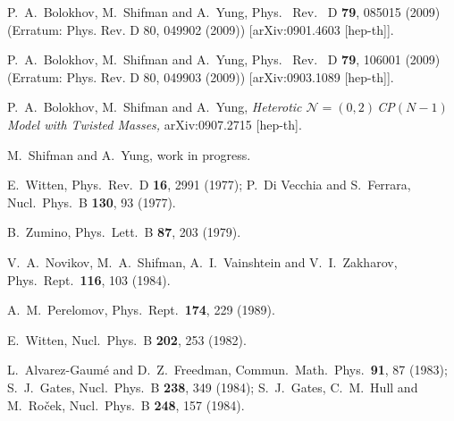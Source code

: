 \documentclass[epsfig,12pt]{article}
\newcommand{\nzt}{${\mathcal N}=(0,2)\,$}
\newcommand{\cpn}{CP$(N-1)\,$}
\begin{document}
{\begin{thebibliography}{99}
P.~A.~Bolokhov, M.~Shifman and A.~Yung,
  Phys. \ Rev. \ D {\bf 79}, 085015 (2009) (Erratum: Phys. Rev. D 80, 049902 (2009))
  [arXiv:0901.4603 [hep-th]].
  
  P.~A.~Bolokhov, M.~Shifman and A.~Yung,
  Phys. \ Rev. \ D {\bf 79}, 106001 (2009) (Erratum: Phys. Rev. D 80, 049903 (2009))
  [arXiv:0903.1089 [hep-th]].
  
  P.~A.~Bolokhov, M.~Shifman and A.~Yung,
{\em Heterotic \nzt \mbox{\cpn} Model with Twisted Masses,}
  arXiv:0907.2715 [hep-th].
  
   M.~Shifman and A.~Yung, work in progress.
  
  E.~Witten,
  Phys.\ Rev.\  D {\bf 16}, 2991 (1977);
  P.~Di Vecchia and S.~Ferrara,
  Nucl.\ Phys.\  B {\bf 130}, 93 (1977).

 B.~Zumino,
  Phys.\ Lett.\  B {\bf 87}, 203 (1979).

 V.~A.~Novikov, M.~A.~Shifman, A.~I.~Vainshtein and V.~I.~Zakharov,
  Phys.\ Rept.\  {\bf 116}, 103 (1984).
   
 A.~M.~Perelomov,
  Phys.\ Rept.\  {\bf 174}, 229 (1989).
  
  E.~Witten,
  Nucl.\ Phys.\  B {\bf 202}, 253 (1982).
  
 L.~Alvarez-Gaum\'{e} and D.~Z.~Freedman,
Commun.\ Math.\ Phys.\  {\bf 91}, 87 (1983);
S.~J.~Gates,
Nucl.\ Phys.\ B {\bf 238}, 349 (1984);
S.~J.~Gates, C.~M.~Hull and M.~Ro\v{c}ek,
Nucl.\ Phys.\ B {\bf 248}, 157 (1984).


\end{thebibliography}}
\end{document}
